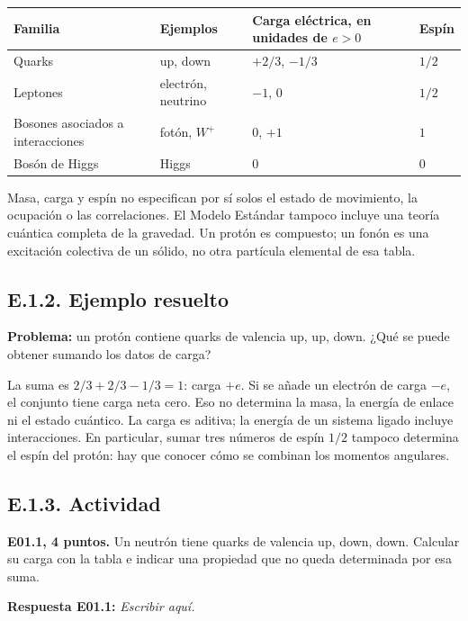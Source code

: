 \documentclass[
  spanish,
  10pt,
  a4paper,
]{article}
\newcounter{none} %
\begin{document}
{\def\LTcaptype{none} %
\begin{longtable}[]{@{}llll@{}}
\toprule\noalign{}
Familia & Ejemplos & Carga eléctrica, en unidades de \(e>0\) & Espín \\
\midrule\noalign{}
\endhead
\bottomrule\noalign{}
\endlastfoot
Quarks & up, down & \(+2/3\), \(-1/3\) & \(1/2\) \\
Leptones & electrón, neutrino & \(-1\), \(0\) & \(1/2\) \\
Bosones asociados a interacciones & fotón, \(W^+\) & \(0\), \(+1\) &
\(1\) \\
Bosón de Higgs & Higgs & \(0\) & \(0\) \\
\end{longtable}
}

Masa, carga y espín no especifican por sí solos el estado de movimiento,
la ocupación o las correlaciones. El Modelo Estándar tampoco incluye una
teoría cuántica completa de la gravedad. Un protón es compuesto; un
fonón es una excitación colectiva de un sólido, no otra partícula
elemental de esa tabla.

\subsection{E.1.2. Ejemplo resuelto}\label{e.1.2.-ejemplo-resuelto}

\textbf{Problema:} un protón contiene quarks de valencia up, up, down.
¿Qué se puede obtener sumando los datos de carga?

La suma es \(2/3+2/3-1/3=1\): carga \(+e\). Si se añade un electrón de
carga \(-e\), el conjunto tiene carga neta cero. Eso no determina la
masa, la energía de enlace ni el estado cuántico. La carga es aditiva;
la energía de un sistema ligado incluye interacciones. En particular,
sumar tres números de espín \(1/2\) tampoco determina el espín del
protón: hay que conocer cómo se combinan los momentos angulares.

\subsection{E.1.3. Actividad}\label{e.1.3.-actividad}


\textbf{E01.1, 4 puntos.} Un neutrón tiene quarks de valencia up, down,
down. Calcular su carga con la tabla e indicar una propiedad que no
queda determinada por esa suma.

\textbf{Respuesta E01.1:} \emph{Escribir aquí.}
\end{document}
